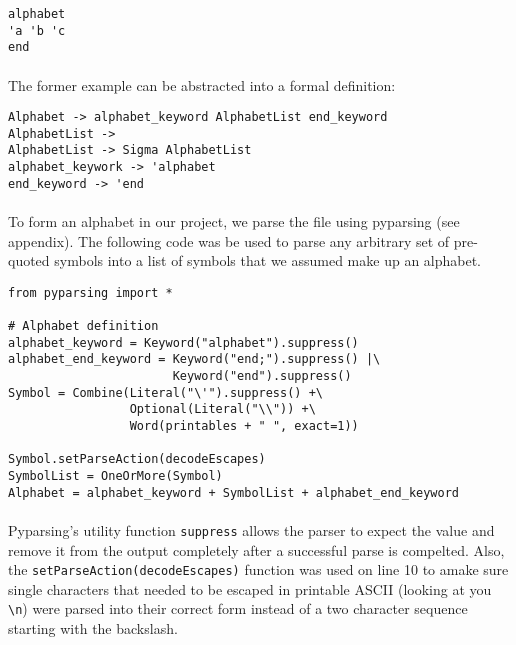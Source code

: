 \documentclass{article}
\begin{document}
\begin{verbatim}
alphabet
'a 'b 'c
end
\end{verbatim}

\paragraph{} The former example can be abstracted into a formal definition:
\begin{verbatim}
Alphabet -> alphabet_keyword AlphabetList end_keyword
AlphabetList -> 
AlphabetList -> Sigma AlphabetList
alphabet_keywork -> 'alphabet
end_keyword -> 'end
\end{verbatim}

\paragraph{}To form an alphabet in our project, we parse the file using pyparsing
(see appendix). The following code was be used to parse any arbitrary
set of pre-quoted symbols into a list of symbols that we assumed make up
an alphabet.

\begin{verbatim}
from pyparsing import *

# Alphabet definition
alphabet_keyword = Keyword("alphabet").suppress()
alphabet_end_keyword = Keyword("end;").suppress() |\
                       Keyword("end").suppress()
Symbol = Combine(Literal("\'").suppress() +\
                 Optional(Literal("\\")) +\ 
                 Word(printables + " ", exact=1))

Symbol.setParseAction(decodeEscapes)
SymbolList = OneOrMore(Symbol)
Alphabet = alphabet_keyword + SymbolList + alphabet_end_keyword
\end{verbatim}

\paragraph{} Pyparsing's utility function \verb|suppress| allows the 
parser to expect the value and remove it from the output completely
after a successful parse is compelted. Also, the
\verb|setParseAction(decodeEscapes)| function was used on line 10 to
amake sure single characters that needed to be escaped in printable
ASCII (looking at you \verb|\n|) were parsed into their correct form
instead of a two character sequence starting with the backslash.
\end{document}
